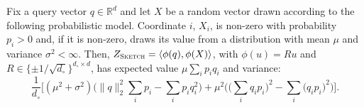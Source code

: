 \begin{theorem}
    \label{theorem:sketching:jl-variance-fixed-query}
    Fix a query vector $q \in \mathbb{R}^d$ and let $X$ be
    a random vector drawn according to the following probabilistic model.
    Coordinate $i$, $X_i$, is non-zero with probability $p_i > 0$ and,
    if it is non-zero, draws its value from a distribution with mean $\mu$
    and variance $\sigma^2 < \infty$. Then, $Z_\textsc{Sketch} = \langle \phi(q), \phi(X) \rangle$,
    with $\phi(u) = R u$ and $R \in \{\pm 1/\sqrt{d_\circ} \}^{d_\circ \times d}$,
    has expected value $\mu \sum_i p_i q_i$ and variance:
    \begin{equation*}
        \frac{1}{d_\circ} \Bigg[
        (\mu^2 + \sigma^2)\Big( \lVert q \rVert_2^2 \sum_i p_i - \sum_i p_i q_i^2 \Big) +
        \mu^2 \Big( \big(\sum_i q_i p_i\big)^2 - \sum_i \big(q_i p_i\big)^2 \Big)
        \Bigg].
    \end{equation*}
\end{theorem}
